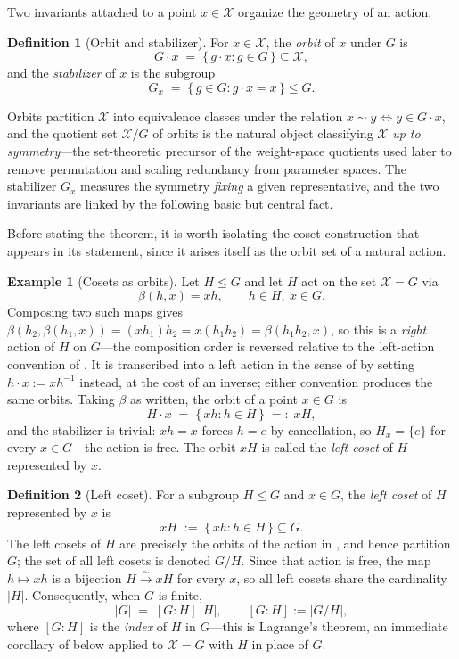 \documentclass[11pt]{article}
\theoremstyle{plain}
\theoremstyle{definition}
\newtheorem{Definition}{Definition}[section]
\newtheorem{Example}{Example}[section]
\begin{document}
Two invariants attached to a point $x \in \mathcal{X}$ organize the geometry of an
action.

\begin{Definition}[Orbit and stabilizer]
\label{def:orbit-stabilizer}
For $x \in \mathcal{X}$, the \emph{orbit} of $x$ under $G$ is
\[
    G \cdot x \;=\; \{\, g \cdot x : g \in G \,\} \subseteq \mathcal{X},
\]
and the \emph{stabilizer} of $x$ is the subgroup
\[
    G_x \;=\; \{\, g \in G : g \cdot x = x \,\} \leq G.
\]
\end{Definition}

Orbits partition $\mathcal{X}$ into equivalence classes under the relation
$x \sim y \iff y \in G \cdot x$, and the quotient set $\mathcal{X} / G$ of orbits is
the natural object classifying $\mathcal{X}$ \emph{up to symmetry}---the set-theoretic
precursor of the weight-space quotients used later to remove permutation and
scaling redundancy from parameter spaces. The stabilizer $G_x$ measures the
symmetry \emph{fixing} a given representative, and the two invariants are
linked by the following basic but central fact.

Before stating the theorem, it is worth isolating the coset construction
that appears in its statement, since it arises itself as the orbit set of a
natural action.

\begin{Example}[Cosets as orbits]
\label{ex:cosets-as-orbits}
Let $H \leq G$ and let $H$ act on the set $\mathcal{X} = G$ via
\[
    \beta(h,x) = x h, \qquad h \in H,\ x \in G.
\]
Composing two such maps gives $\beta(h_2, \beta(h_1,x)) = (x h_1) h_2 = x(h_1 h_2) = \beta(h_1 h_2, x)$,
so this is a \emph{right} action of $H$ on $G$---the composition order is
reversed relative to the left-action convention of
. It is transcribed into a left action in
the sense of  by setting
$h \cdot x := x h^{-1}$ instead, at the cost of an inverse; either
convention produces the same orbits. Taking $\beta$ as written, the orbit of
a point $x \in G$ is
\[
    H \cdot x \;=\; \{\, xh : h \in H \,\} \;=:\; xH,
\]
and the stabilizer is trivial: $xh = x$ forces $h = e$ by cancellation, so
$H_x = \{e\}$ for every $x \in G$---the action is free. The orbit $xH$ is
called the \emph{left coset} of $H$ represented by $x$.
\end{Example}

\begin{Definition}[Left coset]
\label{def:left-coset}
For a subgroup $H \leq G$ and $x \in G$, the \emph{left coset} of $H$
represented by $x$ is
\[
    xH \;:=\; \{\, xh : h \in H \,\} \subseteq G.
\]
The left cosets of $H$ are precisely the orbits of the action in
, and hence partition $G$; the set of all
left cosets is denoted $G/H$. Since that action is free, the map
$h \mapsto xh$ is a bijection $H \xrightarrow{\sim} xH$ for every $x$, so all
left cosets share the cardinality $|H|$. Consequently, when $G$ is finite,
\[
    |G| \;=\; [G:H]\,|H|, \qquad [G:H] := |G/H|,
\]
where $[G:H]$ is the \emph{index} of $H$ in $G$---this is Lagrange's
theorem, an immediate corollary of  below
applied to $\mathcal{X} = G$ with $H$ in place of $G$.
\end{Definition}
\end{document}
